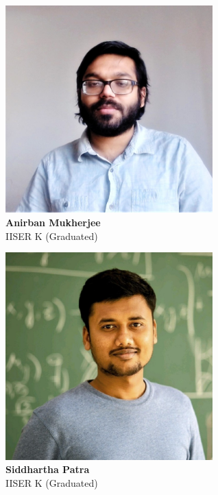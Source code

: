 \documentclass[aspectratio=169]{beamer}
\begin{document}
\begin{frame}{}
\begin{minipage}{0.25\textwidth}
	\centering
	\includegraphics[width=0.6\textwidth]{amukherjee.jpg}\\
	\footnotesize{{\bf Anirban Mukherjee}\\
	IISER K (Graduated)}
\end{minipage}
\begin{minipage}{0.25\textwidth}
	\centering
	\includegraphics[width=0.6\textwidth]{spatra.jpeg}\\
	\footnotesize{{\bf Siddhartha Patra}\\
	IISER K (Graduated)}
\end{minipage}
\begin{minipage}{0.1\textwidth}

\end{minipage}
\end{frame}
\end{document}
